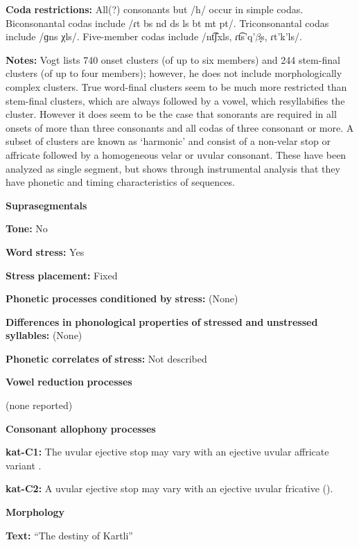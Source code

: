 \begin{styleBody}
\textbf{Coda} \textbf{restrictions:} All(?) consonants but /h/ occur in simple codas. Biconsonantal codas include /ɾt bs nd ds ls bt mt pt/. Triconsonantal codas include /ɡns χls/. Five-member codas include /nt͡ʃxls, ɾt͡s’q’$\beta ̞$s, ɾt'k'ls/.

\textbf{Notes:} Vogt lists 740 onset clusters (of up to six members) and 244 stem-final clusters (of up to four members); however, he does not include morphologically complex clusters. True word-final clusters seem to be much more restricted than stem-final clusters, which are always followed by a vowel, which resyllabifies the cluster. However it does seem to be the case that sonorants are required in all onsets of more than three consonants and all codas of three consonant or more. A subset of clusters are known as ‘harmonic’ and consist of a non-velar stop or affricate followed by a homogeneous velar or uvular consonant. These have been analyzed as single segment, but \citet{Chitoran1998} shows through instrumental analysis that they have phonetic and timing characteristics of sequences.

\textbf{Suprasegmentals}

\textbf{Tone:} No

\textbf{Word} \textbf{stress:} Yes

\textbf{Stress} \textbf{placement:} Fixed

\textbf{Phonetic} \textbf{processes} \textbf{conditioned} \textbf{by} \textbf{stress:} (None)

\textbf{Differences} \textbf{in} \textbf{phonological} \textbf{properties} \textbf{of} \textbf{stressed} \textbf{and} \textbf{unstressed} \textbf{syllables:} (None)

\textbf{Phonetic} \textbf{correlates} \textbf{of} \textbf{stress:} Not described

\textbf{Vowel} \textbf{reduction} \textbf{processes}

(none reported)

\textbf{Consonant} \textbf{allophony} \textbf{processes}

\textbf{kat-C1:} The uvular ejective stop may vary with an ejective uvular affricate variant \citep{Aronson1991}.

\textbf{kat-C2:} A uvular ejective stop may vary with an ejective uvular fricative (\citealt{ShostedChikovani2006}).

\textbf{Morphology}

\textbf{Text:} “The destiny of Kartli” \citep[655-663]{Hewitt1995}


\end{styleBody}
